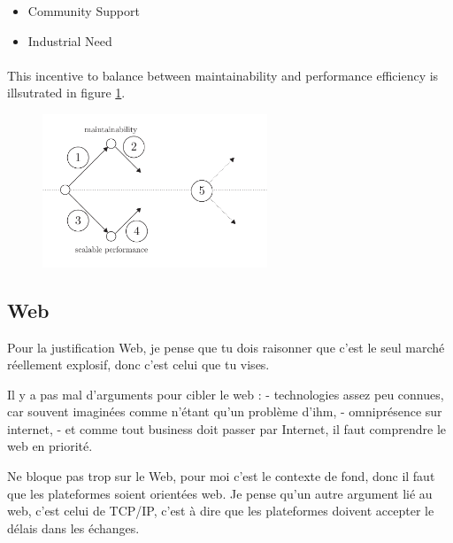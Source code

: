 \begin{itemize}
\item Community Support
\item Industrial Need
\end{itemize}

\paragraph{}

This incentive to balance between maintainability and performance efficiency is illsutrated in figure \ref{fig:state-of-the-art}.

\begin{figure}[h!] \label{fig:state-of-the-art}
\begin{center}
\includegraphics[width=0.6\textwidth]{../ressources/state-of-the-art.pdf}
\end{center}
\end{figure}


\subsection{Web}

Pour la justification Web, je pense que tu dois raisonner que c'est le seul marché réellement explosif, donc c'est celui que tu vises. 

Il y a pas mal d'arguments pour cibler le web :
- technologies assez peu connues, car souvent imaginées comme n'étant qu'un problème d'ihm,
- omniprésence sur internet,
- et comme tout business doit passer par Internet, il faut comprendre le web en priorité. 

Ne bloque pas trop sur le Web, pour moi c'est le contexte de fond, donc il faut que les plateformes soient orientées web. Je pense qu'un autre argument lié au web, c'est celui de TCP/IP, c'est à dire que les plateformes doivent accepter le délais dans les échanges. 
